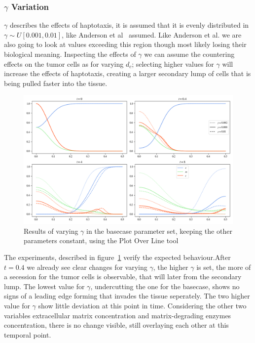 \subsubsection*{$\gamma$ Variation}
$\gamma$ describes the effects of haptotaxis, it is assumed that it is evenly distributed in $\gamma \sim U[0.001,0.01]$, like Anderson et al~\cite{anderson_mathematical_2000} assumed. Like Anderson et al. we are also going to look at values exceeding this region though most likely losing their biological meaning. Inspecting the effects of $\gamma$ we can assume the countering effects on the tumor cells as for varying $d_c$; selecting higher values for $\gamma$ will increase the effects of haptotaxis, creating a larger secondary lump of cells that is being pulled faster into the tissue.
\begin{figure}[h!]
    \centering
    \includegraphics[width=\textwidth]{resources/images/gamma_variation.png}
    \caption{Results of varying $\gamma$ in the basecase parameter set, keeping the other parameters constant, using the Plot Over Line tool}
    \label{fig:gamma_variation}
\end{figure}
The experiments, described in figure~\ref{fig:gamma_variation} verify the expected behaviour.\newline After $t=0.4$ we already see clear changes for varying $\gamma$, the higher $\gamma$ is set, the more of a secession for the tumor cells is observable, that will later from the secondary lump. The lowest value for $\gamma$, undercutting the one for the basecase, shows no signs of a leading edge forming that invades the tissue seperately. The two higher value for $\gamma$ show little deviation at this point in time. Considering the other two variables extracellular matrix concentration and matrix-degrading enzymes concentration, there is no change visible, still overlaying each other at this temporal point.\newline 
